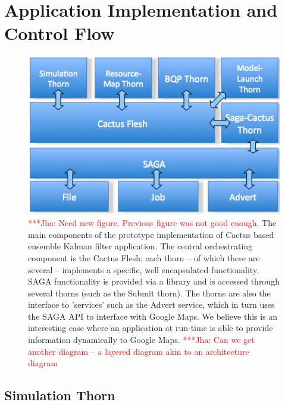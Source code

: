 \documentclass[conference,final]{IEEEtran}
\newcommand{\jhanote}[1]{ {\textcolor{red} { ***Jha: #1 }}}
\begin{document}
\section{Application Implementation and Control Flow} 

\begin{figure}
\begin{center}
\includegraphics[scale=0.34]{./figures/kalmanfilterlayer.png}
\end{center}
\caption{\jhanote{Need new figure. Previous figure was not good enough.}
  The main components of the prototype implementation of Cactus
  based ensemble Kalman filter application. The central orchestrating
  component is the Cactus Flesh; each thorn -- of which there are
  several -- implements a specific, well encapsulated functionality.
  SAGA functionality is provided via a library and is accessed through
  several thorns (such as the Submit thorn).  The thorns are also the
  interface to 'services' such as the Advert service, which in turn
  uses the SAGA API to interface with Google Maps. We believe this is
  an interesting case where an application at run-time is able to
  provide information dynamically to Google Maps. \jhanote{Can we get
    another diagram -- a layered diagram akin to an architecture
    diagram}}
\label{fig:application_architecture}
\end{figure}


\subsection{Simulation Thorn}
\end{document}

